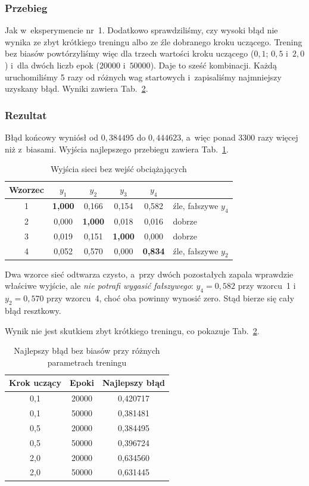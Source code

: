 \documentclass[12pt]{article}
\begin{document}
\subsubsection{Przebieg}
Jak w~eksperymencie nr~1. Dodatkowo sprawdziliśmy, czy wysoki błąd nie wynika
ze zbyt krótkiego treningu albo ze źle dobranego kroku uczącego. Trening bez
biasów powtórzyliśmy więc dla trzech wartości kroku uczącego ($0{,}1$; $0{,}5$
i~$2{,}0$) i~dla dwóch liczb epok ($20000$ i~$50000$). Daje to sześć kombinacji.
Każdą uruchomiliśmy 5 razy od różnych wag startowych i~zapisaliśmy najmniejszy
uzyskany błąd. Wyniki zawiera Tab.~\ref{tab:krok}.

\subsubsection{Rezultat}
Błąd końcowy wyniósł od $0{,}384495$ do $0{,}444623$, a~więc ponad 3300 razy
więcej niż z~biasami. Wyjścia najlepszego przebiegu zawiera
Tab.~\ref{tab:bezbias}.

\begin{table}[h]
\centering
\caption{Wyjścia sieci bez wejść obciążających}
\label{tab:bezbias}
\begin{tabular}{cccccl}
\toprule
\textbf{Wzorzec} & $y_1$ & $y_2$ & $y_3$ & $y_4$ & \\
\midrule
1 & \textbf{1,000} & 0,166 & 0,154 & 0,582 & źle, fałszywe $y_4$ \\
2 & 0,000 & \textbf{1,000} & 0,018 & 0,016 & dobrze \\
3 & 0,019 & 0,151 & \textbf{1,000} & 0,000 & dobrze \\
4 & 0,052 & 0,570 & 0,000 & \textbf{0,834} & źle, fałszywe $y_2$ \\
\bottomrule
\end{tabular}
\end{table}

Dwa wzorce sieć odtwarza czysto, a~przy dwóch pozostałych zapala wprawdzie
właściwe wyjście, ale \emph{nie potrafi wygasić fałszywego}: $y_4 = 0{,}582$
przy wzorcu~1 i~$y_2 = 0{,}570$ przy wzorcu~4, choć oba powinny wynosić zero.
Stąd bierze się cały błąd resztkowy.

Wynik nie jest skutkiem zbyt krótkiego treningu, co pokazuje
Tab.~\ref{tab:krok}.

\begin{table}[h]
\centering
\caption{Najlepszy błąd bez biasów przy różnych parametrach treningu}
\label{tab:krok}
\begin{tabular}{ccc}
\toprule
\textbf{Krok uczący} & \textbf{Epoki} & \textbf{Najlepszy błąd} \\
\midrule
0,1 & 20000 & 0,420717 \\
0,1 & 50000 & 0,381481 \\
0,5 & 20000 & 0,384495 \\
0,5 & 50000 & 0,396724 \\
2,0 & 20000 & 0,634560 \\
2,0 & 50000 & 0,631445 \\
\bottomrule
\end{tabular}
\end{table}
\end{document}
